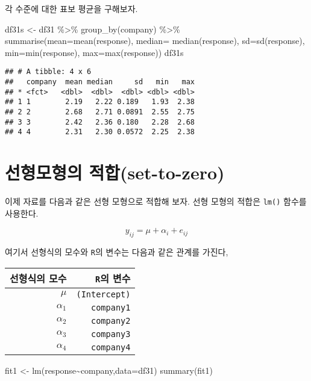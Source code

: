 \documentclass[
]{book}
\newenvironment{Shaded}{\begin{snugshade}}{\end{snugshade}}
\newcommand{\AttributeTok}[1]{\textcolor[rgb]{0.77,0.63,0.00}{#1}}
\newcommand{\FunctionTok}[1]{\textcolor[rgb]{0.00,0.00,0.00}{#1}}
\newcommand{\NormalTok}[1]{#1}
\newcommand{\OtherTok}[1]{\textcolor[rgb]{0.56,0.35,0.01}{#1}}
\newcommand{\SpecialCharTok}[1]{\textcolor[rgb]{0.00,0.00,0.00}{#1}}
\begin{document}
각 수준에 대한 표보 평균을 구해보자.

\begin{Shaded}
\begin{Highlighting}[]
\NormalTok{df31s }\OtherTok{\textless{}{-}}\NormalTok{ df31 }\SpecialCharTok{\%\textgreater{}\%} \FunctionTok{group\_by}\NormalTok{(company)  }\SpecialCharTok{\%\textgreater{}\%}  \FunctionTok{summarise}\NormalTok{(}\AttributeTok{mean=}\FunctionTok{mean}\NormalTok{(response), }\AttributeTok{median=} \FunctionTok{median}\NormalTok{(response), }\AttributeTok{sd=}\FunctionTok{sd}\NormalTok{(response), }\AttributeTok{min=}\FunctionTok{min}\NormalTok{(response), }\AttributeTok{max=}\FunctionTok{max}\NormalTok{(response))}
\NormalTok{df31s}
\end{Highlighting}
\end{Shaded}

\begin{verbatim}
## # A tibble: 4 x 6
##   company  mean median     sd   min   max
## * <fct>   <dbl>  <dbl>  <dbl> <dbl> <dbl>
## 1 1        2.19   2.22 0.189   1.93  2.38
## 2 2        2.68   2.71 0.0891  2.55  2.75
## 3 3        2.42   2.36 0.180   2.28  2.68
## 4 4        2.31   2.30 0.0572  2.25  2.38
\end{verbatim}

\hypertarget{uxc120uxd615uxbaa8uxd615uxc758-uxc801uxd569set-to-zero}{%
\section{선형모형의 적합(set-to-zero)}\label{uxc120uxd615uxbaa8uxd615uxc758-uxc801uxd569set-to-zero}}

이제 자료를 다음과 같은 선형 모형으로 적합해 보자. 선형 모형의 적합은
\texttt{lm()} 함수를 사용한다.

\[ y_{ij} = \mu + \alpha_i + e_{ij}  \]

여기서 선형식의 모수와 \texttt{R}의 변수는 다음과 같은 관계를 가진다,

\begin{longtable}[]{@{}rr@{}}
\toprule
선형식의 모수 & \texttt{R}의 변수\tabularnewline
\midrule
\endhead
\(\mu\) & \texttt{(Intercept)}\tabularnewline
\(\alpha_1\) & \texttt{company1}\tabularnewline
\(\alpha_2\) & \texttt{company2}\tabularnewline
\(\alpha_3\) & \texttt{company3}\tabularnewline
\(\alpha_4\) & \texttt{company4}\tabularnewline
\bottomrule
\end{longtable}

\begin{Shaded}
\begin{Highlighting}[]
\NormalTok{fit1 }\OtherTok{\textless{}{-}} \FunctionTok{lm}\NormalTok{(response}\SpecialCharTok{\textasciitilde{}}\NormalTok{company,}\AttributeTok{data=}\NormalTok{df31)}
\FunctionTok{summary}\NormalTok{(fit1)}
\end{Highlighting}
\end{Shaded}
\end{document}
